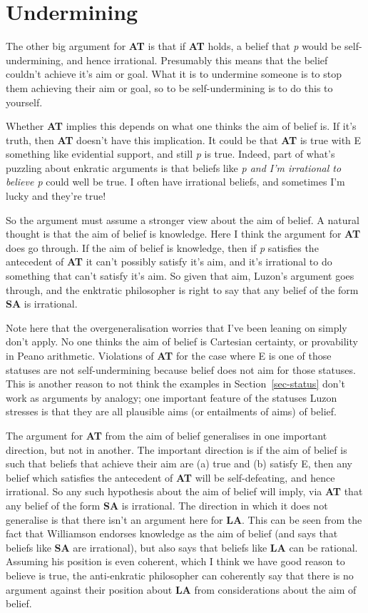 \documentclass[
  11pt,
  letterpaper,
  DIV=11,
  numbers=noendperiod,
  twoside]{scrartcl}
\begin{document}
\section{Undermining}\label{sec-aim}

The other big argument for \textbf{AT} is that if \textbf{AT} holds, a
belief that \emph{p} would be self-undermining, and hence irrational.
Presumably this means that the belief couldn't achieve it's aim or goal.
What it is to undermine someone is to stop them achieving their aim or
goal, so to be self-undermining is to do this to yourself.

Whether \textbf{AT} implies this depends on what one thinks the aim of
belief is. If it's truth, then \textbf{AT} doesn't have this
implication. It could be that \textbf{AT} is true with E something like
evidential support, and still \emph{p} is true. Indeed, part of what's
puzzling about enkratic arguments is that beliefs like \emph{p and I'm
irrational to believe p} could well be true. I often have irrational
beliefs, and sometimes I'm lucky and they're true!

So the argument must assume a stronger view about the aim of belief. A
natural thought is that the aim of belief is knowledge. Here I think the
argument for \textbf{AT} does go through. If the aim of belief is
knowledge, then if \emph{p} satisfies the antecedent of \textbf{AT} it
can't possibly satisfy it's aim, and it's irrational to do something
that can't satisfy it's aim. So given that aim, Luzon's argument goes
through, and the enktratic philosopher is right to say that any belief
of the form \textbf{SA} is irrational.

Note here that the overgeneralisation worries that I've been leaning on
simply don't apply. No one thinks the aim of belief is Cartesian
certainty, or provability in Peano arithmetic. Violations of \textbf{AT}
for the case where E is one of those statuses are not self-undermining
because belief does not aim for those statuses. This is another reason
to not think the examples in Section~\ref{sec-status} don't work as
arguments by analogy; one important feature of the statuses Luzon
stresses is that they are all plausible aims (or entailments of aims) of
belief.

The argument for \textbf{AT} from the aim of belief generalises in one
important direction, but not in another. The important direction is if
the aim of belief is such that beliefs that achieve their aim are (a)
true and (b) satisfy E, then any belief which satisfies the antecedent
of \textbf{AT} will be self-defeating, and hence irrational. So any such
hypothesis about the aim of belief will imply, via \textbf{AT} that any
belief of the form \textbf{SA} is irrational. The direction in which it
does not generalise is that there isn't an argument here for
\textbf{LA}. This can be seen from the fact that Williamson endorses
knowledge as the aim of belief (and says that beliefs like \textbf{SA}
are irrational), but also says that beliefs like \textbf{LA} can be
rational. Assuming his position is even coherent, which I think we have
good reason to believe is true, the anti-enkratic philosopher can
coherently say that there is no argument against their position about
\textbf{LA} from considerations about the aim of belief.
\end{document}
